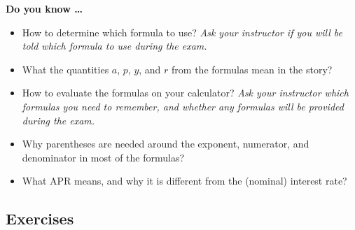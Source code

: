 


\noindent \textbf{Do you know \ldots}

\begin{itemize} 
\item How to determine which formula to use? \emph{Ask your instructor if you will be told which formula to use during the exam.}  
\item What the quantities $a$, $p$, $y$, and $r$ from the formulas mean in the story? 
\item How to evaluate the formulas on your calculator?  \emph{Ask your instructor which formulas you need to remember, and whether any formulas will be provided during the exam.}
\item Why parentheses are needed around the exponent, numerator, and denominator in most of the formulas? 
\item What APR means, and why it is different from the (nominal) interest rate? 
  
\end{itemize}

\subsection*{Exercises}

